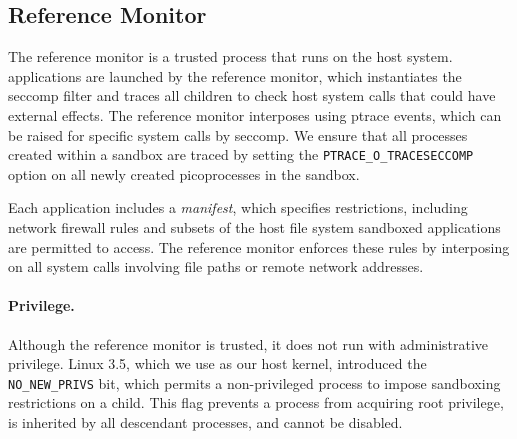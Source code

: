 \subsection{Reference Monitor}
\label{sec:graphene:security:monitor}

The reference monitor is a trusted process that runs on the host system.
\sysname{} applications are launched by the reference monitor,
which instantiates the seccomp filter and traces all children
to check host system calls that could have external effects.
The reference monitor interposes using ptrace events, 
which can be raised for specific system calls by seccomp.
We ensure that all processes created within a sandbox are traced
by setting the {\tt PTRACE\_O\_TRACESECCOMP} option on all newly created picoprocesses
in the sandbox.


Each application includes a {\em manifest}, which specifies restrictions,
including network firewall rules and subsets of the host file system sandboxed
applications are permitted to access.  The reference monitor enforces these
rules by interposing on all system calls involving file paths or remote network addresses.

\paragraph{Privilege.~} 
Although the reference monitor is trusted, it does not run 
with administrative privilege.
Linux 3.5, which we use as our host kernel, 
introduced the {\tt NO\_NEW\_PRIVS} bit, which permits
a non-privileged process to impose sandboxing restrictions on a child.
This flag prevents a process from acquiring root privilege, %
is inherited by all descendant processes,
and cannot be disabled.

